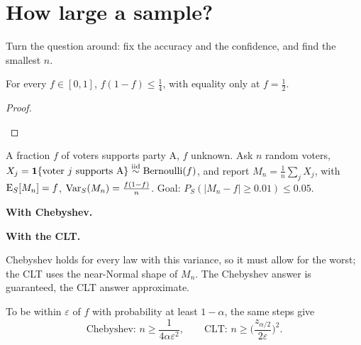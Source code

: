 \section{How large a sample?}

Turn the question around: fix the accuracy and the confidence, and find the smallest $n$.

\begin{lemma}[A bound on $f(1-f)$]
For every $f\in[0,1]$, $\boxed{f(1-f)\le\frac14}$, with equality only at $f=\frac12$.
\end{lemma}
\begin{proof}
\begin{deriv}
\end{deriv}
\end{proof}

\begin{example}
A fraction $f$ of voters supports party A, $f$ unknown. Ask $n$ random voters, $X_j=\mathbf{1}\{\text{voter } j\text{ supports A}\}\overset{\text{iid}}{\sim}\text{Bernoulli}(f)$, and report $M_n=\frac1n\sum_jX_j$, with $\operatorname{E}_S[M_n]=f$, $\operatorname{Var}_S(M_n)=\frac{f(1-f)}{n}$. Goal: $P_S(|M_n-f|\ge0.01)\le0.05$.

\textbf{With Chebyshev.}
\begin{deriv}
\end{deriv}

\textbf{With the CLT.}
\begin{deriv}
\end{deriv}
Chebyshev holds for every law with this variance, so it must allow for the worst; the CLT uses the near-Normal shape of $M_n$. The Chebyshev answer is guaranteed, the CLT answer approximate.
\end{example}

To be within $\varepsilon$ of $f$ with probability at least $1-\alpha$, the same steps give
\[
  \boxed{\;\text{Chebyshev: }n\ge\frac{1}{4\alpha\varepsilon^2},\qquad\text{CLT: }n\ge\Big(\frac{z_{\alpha/2}}{2\varepsilon}\Big)^2.\;}
\]
